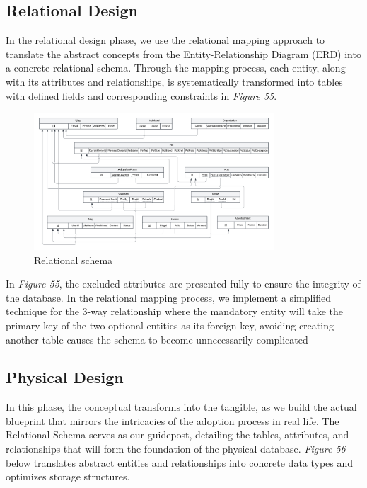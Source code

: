 \subsection{Relational Design}

In the relational design phase, we use the relational mapping approach
to translate the abstract concepts from the Entity-Relationship Diagram
(ERD) into a concrete relational schema. Through the mapping process,
each entity, along with its attributes and relationships, is
systematically transformed into tables with defined fields and
corresponding constraints in \emph{Figure 55}.

\begin {figure}[H]
\centering
\includegraphics[width=0.8\textwidth]{Figures/relational_schema.png}
\caption{Relational schema}
\end{figure}

In \emph{Figure 55}, the excluded attributes are presented fully to
ensure the integrity of the database. In the relational mapping process,
we implement a simplified technique for the 3-way relationship where the
mandatory entity will take the primary key of the two optional entities
as its foreign key, avoiding creating another table causes the schema to
become unnecessarily complicated

\subsection{Physical Design}

In this phase, the conceptual transforms into the tangible, as we build the actual blueprint that mirrors the intricacies of the adoption process in real life. The Relational Schema serves as our guidepost, detailing the tables, attributes, and relationships that will form the foundation of the physical database. \textit{Figure 56} below translates abstract entities and relationships into concrete data types and optimizes storage structures.

